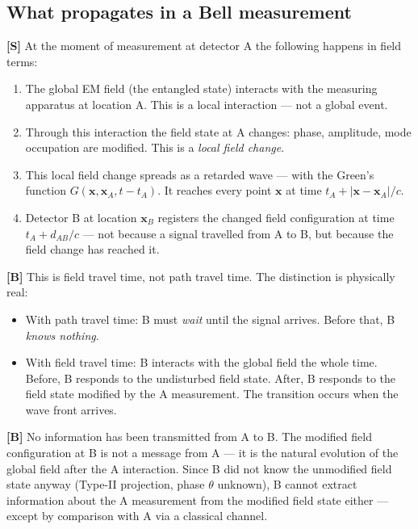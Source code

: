 \subsection{What propagates in a Bell measurement}

\textbf{[S]} At the moment of measurement at detector A the following
happens in field terms:

\begin{enumerate}[leftmargin=1.6em,itemsep=0.3em]
  \item The global EM field (the entangled state) interacts with the
    measuring apparatus at location A. This is a local interaction ---
    not a global event.
  \item Through this interaction the field state at A changes: phase,
    amplitude, mode occupation are modified. This is a \emph{local
    field change}.
  \item This local field change spreads as a retarded wave --- with
    the Green's function $G(\mathbf{x}, \mathbf{x}_A, t-t_A)$. It
    reaches every point $\mathbf{x}$ at time $t_A + |\mathbf{x} -
    \mathbf{x}_A|/c$.
  \item Detector B at location $\mathbf{x}_B$ registers the changed
    field configuration at time $t_A + d_{AB}/c$ --- not because a
    signal travelled from A to B, but because the field change has
    reached it.
\end{enumerate}

\textbf{[B]} This is field travel time, not path travel time. The
distinction is physically real:

\begin{itemize}[leftmargin=1.4em,itemsep=0.2em]
  \item With path travel time: B must \emph{wait} until the signal
    arrives. Before that, B \emph{knows nothing}.
  \item With field travel time: B interacts with the global field
    the whole time. Before, B responds to the undisturbed field state.
    After, B responds to the field state modified by the A measurement.
    The transition occurs when the wave front arrives.
\end{itemize}

\textbf{[B]} No information has been transmitted from A to B. The
modified field configuration at B is not a message from A --- it is
the natural evolution of the global field after the A interaction.
Since B did not know the unmodified field state anyway (Type-II
projection, phase $\theta$ unknown), B cannot extract information
about the A measurement from the modified field state either ---
except by comparison with A via a classical channel.

